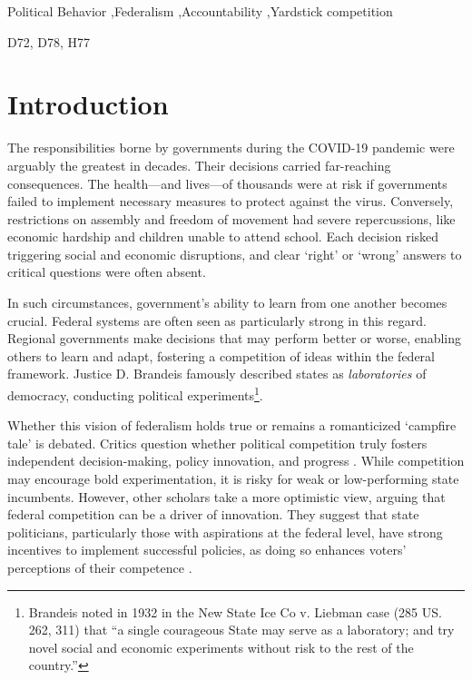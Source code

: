 \documentclass[authoryear,12pt, 3p]{elsarticle}
\theoremstyle{break}
\begin{document}
\begin{frontmatter}
\begin{keyword}
Political Behavior \sep Federalism \sep Accountability \sep Yardstick competition

\JEL D72, D78,  H77
\end{keyword}
\end{frontmatter}
	
\linenumbers
	
\section[Introduction]{Introduction}\label{sec.introduction}
The responsibilities borne by governments during the COVID-19 pandemic were arguably the greatest in decades. Their decisions carried far-reaching consequences. The health—and lives—of thousands were at risk if governments failed to implement necessary measures to protect against the virus. Conversely, restrictions on assembly and freedom of movement had severe repercussions, like  economic hardship and children unable to attend school. Each decision risked triggering social and economic disruptions, and clear `right' or `wrong' answers to critical questions were often absent.

In such circumstances, government's ability to learn from one another becomes crucial. Federal systems are often seen as particularly strong in this regard. Regional governments make decisions that may perform better or worse, enabling others to learn and adapt, fostering a competition of ideas within the federal framework. Justice D. Brandeis famously described states as \textit{laboratories} of democracy, conducting political experiments\footnote{Brandeis noted in 1932 in the New State Ice Co v. Liebman case (285 US. 262, 311) that ``a single courageous State may serve as a laboratory; and try novel social and economic experiments without risk to the rest of the country.''}.

Whether this vision of federalism holds true or remains a romanticized `campfire tale' \citep{Tyler2022} is debated. Critics question whether political competition truly fosters independent decision-making, policy innovation, and progress \citep{RoseAckerman1980, Weaver1986, Strumpf2002}. While competition may encourage bold experimentation, it is risky for weak or low-performing state incumbents. However, other scholars take a more optimistic view, arguing that federal competition can be a driver of innovation. They suggest that state politicians, particularly those with aspirations at the federal level, have strong incentives to implement successful policies, as doing so enhances voters' perceptions of their competence \citep{KotSchwager2006}.
\end{document}
